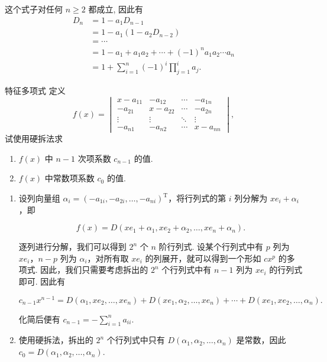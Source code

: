 \begin{solution}
    这个式子对任何 $n \geqslant 2$ 都成立, 因此有
    \begin{align*}
        D_n & =1-a_{1} D_{n-1}                                          \\
            & =1-a_{1}(1-a_{2} D_{n-2})                                 \\
            & =\cdots                                                   \\
            & =1-a_{1}+a_{1} a_{2}+\cdots+(-1)^n a_{1} a_{2} \cdots a_n \\
            & =1+\sum_{i=1}^{n}(-1)^i \prod_{j=1}^i a_j.
    \end{align*}
\end{solution}

\begin{example}{特征多项式}{}
    定义
    \[
        f(x) = \begin{vmatrix}
            x - a_{11} & - a_{12} & \cdots & - a_{1n} \\
            - a_{21} & x - a_{22} & \cdots & - a_{2n} \\
            \vdots   & \vdots   & \ddots & \vdots   \\
            - a_{n1} & - a_{n2} & \cdots & x - a_{nn}
        \end{vmatrix},
    \]
    试使用硬拆法求
    \begin{enumerate}
        \item $f(x)$ 中 $n-1$ 次项系数 $c_{n-1}$ 的值.
        \item $f(x)$ 中常数项系数 $c_0$ 的值.
    \end{enumerate}
\end{example}

\begin{solution}
    \begin{enumerate}
        \item 设列向量组 $\alpha_i = (-a_{1i}, -a_{2i}, \ldots, -a_{ni})^{\mathrm{T}}$，将行列式的第 $i$ 列分解为 $xe_i + \alpha_i$，即

            \[
                f(x) = D(xe_1 + \alpha_1, xe_2 + \alpha_2, \ldots, xe_n + \alpha_n).
            \]

            逐列进行分解，我们可以得到 $2^n$ 个 $n$ 阶行列式. 设某个行列式中有 $p$ 列为 $xe_i$，$n-p$ 列为 $\alpha_i$，对所有取 $xe_i$ 的列展开，就可以得到一个形如 $cx^p$ 的多项式. 因此，我们只需要考虑拆出的 $2^n$ 个行列式中有 $n-1$ 列为 $xe_i$ 的行列式即可. 因此有

            \[
                c_{n-1}x^{n-1} = D(\alpha_1, xe_2, \ldots, xe_n) + D(xe_1, \alpha_2, \ldots, xe_n) + \cdots + D(xe_1, xe_2, \ldots, \alpha_n).
            \]

            化简后便有 $c_{n-1} = -\displaystyle\sum_{i=1}^n a_{ii}$.

        \item 使用硬拆法，拆出的 $2^n$ 个行列式中只有 $D(\alpha_1, \alpha_2, \ldots, \alpha_n)$ 是常数，因此 $c_0 = D(\alpha_1, \alpha_2, \ldots, \alpha_n)$.
    \end{enumerate}
\end{solution}


